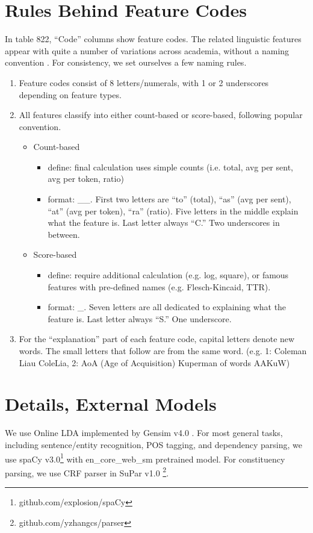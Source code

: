 \documentclass[11pt]{article}
\begin{document}
\section{Rules Behind Feature Codes}
In table 822, ``Code'' columns show feature codes. The related linguistic features appear with quite a number of variations across academia, without a naming convention \citep{A09, 11, A10, A11, A13, A15, A19, A20, lee2020lxper}. For consistency, we set ourselves a few naming rules.
\begin{enumerate}[leftmargin=*]
  \setlength\itemsep{0.1ex}
  \item Feature codes consist of 8 letters/numerals, with 1 or 2 underscores depending on feature types.
  \item All features classify into either count-based or score-based, following popular convention.
  \begin{itemize}[leftmargin=*]
      \item Count-based
      \begin{itemize}[leftmargin=*]
      \item define: final calculation uses simple counts (i.e. total, avg per sent, avg per token, ratio)
      \item format: \_\_. First two letters are ``to'' (total), ``as'' (avg per sent), ``at'' (avg per token), ``ra'' (ratio). Five letters in the middle explain what the feature is. Last letter always ``C.'' Two underscores in between.
      \end{itemize}
      \item Score-based
      \begin{itemize}[leftmargin=*]
      \item define: require additional calculation (e.g. log, square), or famous features with pre-defined names (e.g. Flesch-Kincaid, TTR).
      \item format: \_. Seven letters are all dedicated to explaining what the feature is. Last letter always ``S.'' One underscore.
      \end{itemize}
  \end{itemize}
  \item For the ``explanation'' part of each feature code, capital letters denote new words. The small letters that follow are from the same word. (e.g. 1: Coleman Liau  ColeLia, 2: AoA (Age of Acquisition) Kuperman of words  AAKuW)
\end{enumerate}

\section{Details, External Models}
We use Online LDA implemented by Gensim v4.0 \citep{rehurek_lrec}. For most general tasks, including sentence/entity recognition, POS tagging, and dependency parsing, we use spaCy v3.0\footnote{github.com/explosion/spaCy} \citep{spacy} with en\_core\_web\_sm pretrained model. For constituency parsing, we use CRF parser \citep{zhang-etal-2020-fast} in SuPar v1.0 \footnote{github.com/yzhangcs/parser}. 
\end{document}
